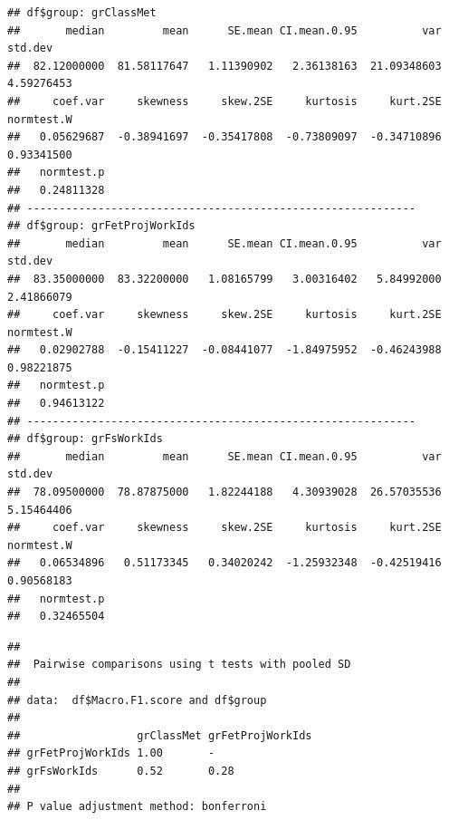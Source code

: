 \documentclass[
]{article}
\newenvironment{Shaded}{\begin{snugshade}}{\end{snugshade}}
\newcommand{\AttributeTok}[1]{\textcolor[rgb]{0.77,0.63,0.00}{#1}}
\newcommand{\ConstantTok}[1]{\textcolor[rgb]{0.00,0.00,0.00}{#1}}
\newcommand{\FunctionTok}[1]{\textcolor[rgb]{0.00,0.00,0.00}{#1}}
\newcommand{\NormalTok}[1]{#1}
\newcommand{\OtherTok}[1]{\textcolor[rgb]{0.56,0.35,0.01}{#1}}
\newcommand{\SpecialCharTok}[1]{\textcolor[rgb]{0.00,0.00,0.00}{#1}}
\newcommand{\StringTok}[1]{\textcolor[rgb]{0.31,0.60,0.02}{#1}}
\begin{document}
\begin{Shaded}
\end{Shaded}

\begin{verbatim}
## df$group: grClassMet
##       median         mean      SE.mean CI.mean.0.95          var      std.dev 
##  82.12000000  81.58117647   1.11390902   2.36138163  21.09348603   4.59276453 
##     coef.var     skewness     skew.2SE     kurtosis     kurt.2SE   normtest.W 
##   0.05629687  -0.38941697  -0.35417808  -0.73809097  -0.34710896   0.93341500 
##   normtest.p 
##   0.24811328 
## ------------------------------------------------------------ 
## df$group: grFetProjWorkIds
##       median         mean      SE.mean CI.mean.0.95          var      std.dev 
##  83.35000000  83.32200000   1.08165799   3.00316402   5.84992000   2.41866079 
##     coef.var     skewness     skew.2SE     kurtosis     kurt.2SE   normtest.W 
##   0.02902788  -0.15411227  -0.08441077  -1.84975952  -0.46243988   0.98221875 
##   normtest.p 
##   0.94613122 
## ------------------------------------------------------------ 
## df$group: grFsWorkIds
##       median         mean      SE.mean CI.mean.0.95          var      std.dev 
##  78.09500000  78.87875000   1.82244188   4.30939028  26.57035536   5.15464406 
##     coef.var     skewness     skew.2SE     kurtosis     kurt.2SE   normtest.W 
##   0.06534896   0.51173345   0.34020242  -1.25932348  -0.42519416   0.90568183 
##   normtest.p 
##   0.32465504
\end{verbatim}

\begin{Shaded}
\end{Shaded}

\begin{verbatim}
## 
##  Pairwise comparisons using t tests with pooled SD 
## 
## data:  df$Macro.F1.score and df$group 
## 
##                  grClassMet grFetProjWorkIds
## grFetProjWorkIds 1.00       -               
## grFsWorkIds      0.52       0.28            
## 
## P value adjustment method: bonferroni
\end{verbatim}
\end{document}
